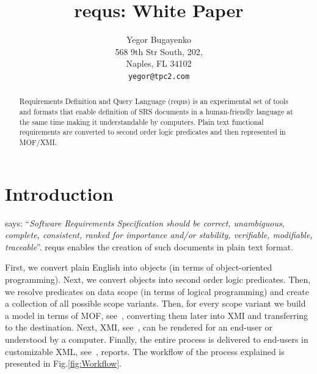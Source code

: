 \documentclass[12pt,oneside,letterpaper]{article}
\begin{document}
    \raggedright
    \setlength{\parindent}{0pt}
    \setlength{\parskip}{1em}
    \newcommand{\type}[1]{\colorbox{lightgray}{\texttt{#1}}}
    \newenvironment{maths}
        {\vspace*{0.5em}\begin{tabular}{l>{\raggedright\arraybackslash}p{20em}}}
        {\end{tabular}\vspace*{1em}}
    \title{requs: White Paper}
    \author{
        Yegor Bugayenko\\
        568 9th Str South, 202, \\
        Naples, FL 34102\\
        \texttt{yegor@tpc2.com}
    }
    \maketitle
    \begin{abstract}
        Requirements Definition and Query Language (requs) is
        an experimental set of tools and formats that enable definition of
        SRS documents in a
        human-friendly language at the same time making it understandable
        by computers. Plain text functional requirements are converted to
        second order logic predicates and then represented in MOF/XMI.
    \end{abstract}




\section{Introduction}

    \citet{ieee830} says: ``\emph{Software Requirements Specification should be
    correct, unambiguous, complete, consistent, ranked for importance and/or stability,
    verifiable, modifiable, traceable}''. requs enables the creation
    of such documents in plain text format.

    First, we convert plain English into objects (in terms of object-oriented
    programming). Next, we convert objects into second order logic predicates.
    Then, we resolve predicates on data scope (in terms of logical programming)
    and create a collection of all possible scope variants. Then, for every
    scope variant we build a model in terms of MOF, see~\citet{mof2}, converting them later
    into XMI and transferring to the destination. Next, XMI, see~\citet{mof-to-xmi}, can be rendered
    for an end-user or understood by a computer. Finally, the entire process
    is delivered to end-users in customizable XML, see~\citet{xml}, reports.
    The workflow of the process explained is presented in Fig.\ref{fig:Workflow}.
\end{document}
